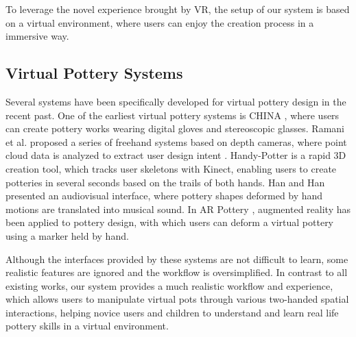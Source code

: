 \documentclass{svjour3}                     %
\begin{document}
To leverage the novel experience brought by VR, the setup of our system is based on a virtual environment, where users can enjoy the creation process in a immersive way.

\subsection{Virtual Pottery Systems}
\label{sec:2.3}


Several systems have been specifically developed for virtual pottery design in the recent past.
One of the earliest virtual pottery systems is CHINA \cite{korida1997interactive}, where users can create pottery works wearing digital gloves and stereoscopic glasses.
Ramani et al. proposed a series of freehand systems based on depth cameras, where point cloud data is analyzed to extract user design intent \cite{ramani2014zpots,ramani2015gesture,ramani2016extracting}.
Handy-Potter \cite{murugappan2013handy} is a rapid 3D creation tool, which tracks user skeletons with Kinect, enabling users to create potteries in several seconds based on the trails of both hands.
Han and Han \cite{han2014virtual} presented an audiovisual interface, where pottery shapes deformed by hand motions are translated into musical sound.
In AR Pottery \cite{han2007ar}, augmented reality has been applied to pottery design, with which users can deform a virtual pottery using a marker held by hand.

Although the interfaces provided by these systems are not difficult to learn, some realistic features are ignored and the workflow is oversimplified.
In contrast to all existing works, our system provides a much realistic workflow and experience, which allows users to manipulate virtual pots through various two-handed spatial interactions, helping novice users and children to understand and learn real life pottery skills in a virtual environment.
\end{document}
